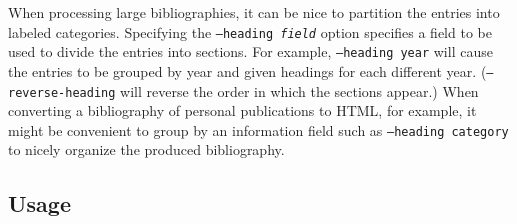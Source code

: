 \documentclass{article}
\begin{document}
When processing large bibliographies, it can be nice to partition the entries into labeled categories. Specifying the \texttt{--heading \textrm{\textit{field}}} option specifies a field to be used to divide the entries into sections. For example, \texttt{--heading year} will cause the entries to be grouped by year and given headings for each different year. (\texttt{--reverse-heading} will reverse the order in which the sections appear.) When converting a bibliography of personal publications to HTML, for example, it might be convenient to group by an information field such as \texttt{--heading category} to nicely organize the produced bibliography.

\subsection{Usage}
\end{document}
